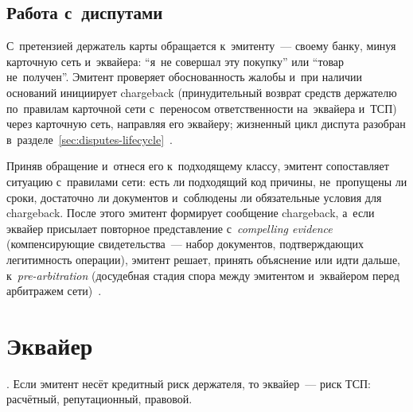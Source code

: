 \subsection*{Работа с~диспутами}

С~претензией держатель карты обращается к~эмитенту~--- своему банку,
минуя карточную сеть и~эквайера: \enquote{я~не совершал эту покупку} или
\enquote{товар не~получен}. Эмитент проверяет обоснованность жалобы и~при
наличии оснований инициирует chargeback (принудительный возврат
  средств держателю по~правилам карточной сети с~переносом ответственности
на~эквайера и~ТСП) через карточную сеть, направляя его эквайеру; жизненный цикл
диспута разобран
в~разделе~\ref{sec:disputes-lifecycle}~\cite{visa-core-rules,mc-chargeback-guide,visa-vcr-merchants}.

Приняв обращение и~отнеся его к~подходящему классу, эмитент сопоставляет
ситуацию с~правилами сети: есть ли подходящий код причины, не~пропущены ли
сроки, достаточно ли документов и~соблюдены ли обязательные условия для
chargeback. После этого эмитент формирует сообщение chargeback, а~если эквайер
присылает повторное представление с~\textit{compelling evidence}
(компенсирующие свидетельства~--- набор документов, подтверждающих легитимность
операции), эмитент решает, принять объяснение или идти дальше,
к~\textit{pre-arbitration} (досудебная стадия спора между эмитентом и~эквайером
перед арбитражем сети)~\cite{visa-core-rules,mc-chargeback-guide,visa-vcr-merchants}.

\section{Эквайер}\label{sec:ia-acquirer}

. Если эмитент несёт кредитный риск держателя, то
эквайер~--- риск ТСП: расчётный, репутационный, правовой.


